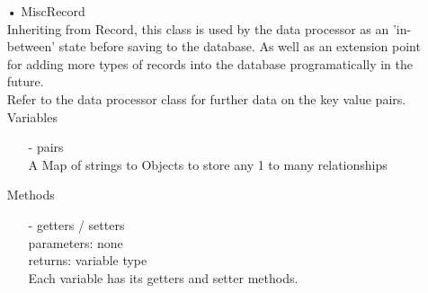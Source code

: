 \documentclass[oneside, english, final]{design}
\begin{document}
\begin{itemize}
	\item[•]MiscRecord
	      \\Inheriting from Record, this class is used by the data processor as an 'in-between' state before saving to the database. As well as an extension point for adding more types of records into the database programatically in the future.
	      \\Refer to the data processor class for further data on the key value pairs.
	      \\Variables
	      \begin{itemize}
		      \item[-] pairs
		            \\ A Map of strings to Objects to store any 1 to many relationships
	      \end{itemize}
	      Methods
	      \begin{itemize}
		      \item[-]getters / setters
		            \\parameters: none
		            \\returns: variable type
		            \\Each variable has its getters and setter methods.
	      \end{itemize}


\end{itemize}
\end{document}
